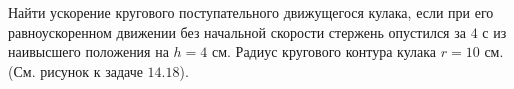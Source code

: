 Найти ускорение кругового поступательного движущегося кулака,
если при его равноускоренном движении без начальной скорости
стержень опустился за $4$ с из наивысшего положения на $h = 4$ см.
Радиус кругового контура кулака $r = 10$ см.
(См. рисунок к задаче $14.18$).
